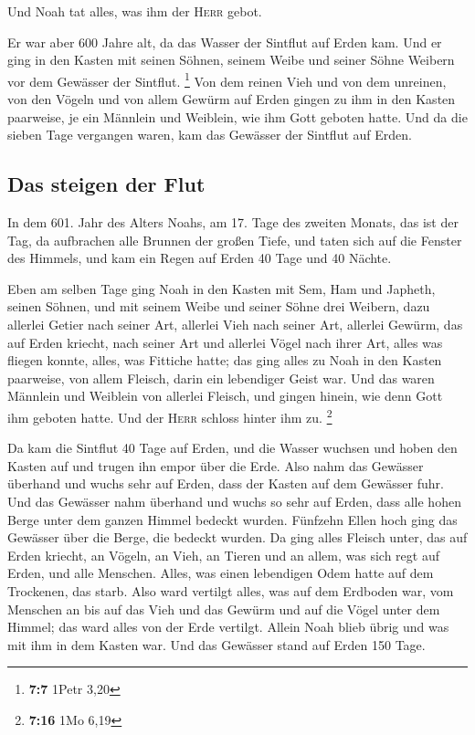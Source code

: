  Und Noah tat alles, was ihm der \textsc{Herr} gebot.

 Er war aber 600 Jahre alt, da das Wasser der Sintflut auf
Erden kam.  Und er ging in den Kasten mit seinen Söhnen,
seinem Weibe und seiner Söhne Weibern vor dem Gewässer der Sintflut.
\footnote{\textbf{7:7} 1Petr 3,20}  Von dem reinen Vieh
und von dem unreinen, von den Vögeln und von allem Gewürm auf Erden
 gingen zu ihm in den Kasten paarweise, je ein Männlein
und Weiblein, wie ihm Gott geboten hatte.  Und da die
sieben Tage vergangen waren, kam das Gewässer der Sintflut auf Erden.

\hypertarget{das-steigen-der-flut}{%
\subsection{Das steigen der Flut}\label{das-steigen-der-flut}}

 In dem 601. Jahr des Alters Noahs, am 17. Tage des
zweiten Monats, das ist der Tag, da aufbrachen alle Brunnen der großen
Tiefe, und taten sich auf die Fenster des Himmels,  und
kam ein Regen auf Erden 40 Tage und 40 Nächte.

 Eben am selben Tage ging Noah in den Kasten mit Sem, Ham
und Japheth, seinen Söhnen, und mit seinem Weibe und seiner Söhne drei
Weibern,  dazu allerlei Getier nach seiner Art, allerlei
Vieh nach seiner Art, allerlei Gewürm, das auf Erden kriecht, nach
seiner Art und allerlei Vögel nach ihrer Art, alles was fliegen konnte,
alles, was Fittiche hatte;  das ging alles zu Noah in den
Kasten paarweise, von allem Fleisch, darin ein lebendiger Geist war.
 Und das waren Männlein und Weiblein von allerlei
Fleisch, und gingen hinein, wie denn Gott ihm geboten hatte. Und der
\textsc{Herr} schloss hinter ihm zu. \footnote{\textbf{7:16} 1Mo 6,19}

 Da kam die Sintflut 40 Tage auf Erden, und die Wasser
wuchsen und hoben den Kasten auf und trugen ihn empor über die Erde.
 Also nahm das Gewässer überhand und wuchs sehr auf
Erden, dass der Kasten auf dem Gewässer fuhr.  Und das
Gewässer nahm überhand und wuchs so sehr auf Erden, dass alle hohen
Berge unter dem ganzen Himmel bedeckt wurden.  Fünfzehn
Ellen hoch ging das Gewässer über die Berge, die bedeckt wurden.
 Da ging alles Fleisch unter, das auf Erden kriecht, an
Vögeln, an Vieh, an Tieren und an allem, was sich regt auf Erden, und
alle Menschen.  Alles, was einen lebendigen Odem hatte
auf dem Trockenen, das starb.  Also ward vertilgt alles,
was auf dem Erdboden war, vom Menschen an bis auf das Vieh und das
Gewürm und auf die Vögel unter dem Himmel; das ward alles von der Erde
vertilgt. Allein Noah blieb übrig und was mit ihm in dem Kasten war.
 Und das Gewässer stand auf Erden 150 Tage.


